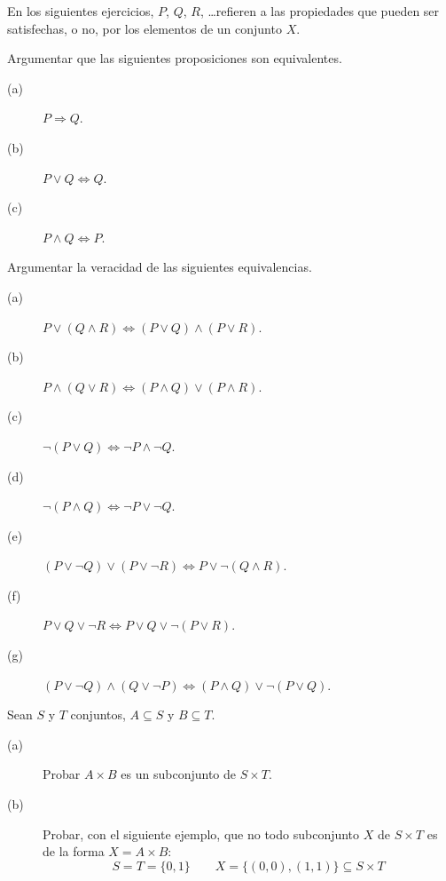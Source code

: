 \noindent
En los siguientes ejercicios, $P$, $Q$, $R$, \ldots refieren a las propiedades que pueden ser satisfechas, o no, por los elementos de un conjunto $X$.

\begin{ejercicio}
    Argumentar que las siguientes proposiciones son equivalentes.
    \begin{description}
        \item [(a)] $P \Longrightarrow Q$.
        \item [(b)] $P\lor Q \Longleftrightarrow Q$.
        \item [(c)] $P\land Q \Longleftrightarrow P$.
    \end{description}
\end{ejercicio}

\begin{ejercicio}
    Argumentar la veracidad de las siguientes equivalencias.
    \begin{description}
        \item [(a)] $P\lor(Q\land R) \Longleftrightarrow (P\lor Q)\land (P\lor R)$.
        \item [(b)] $P\land(Q\lor R) \Longleftrightarrow (P\land Q)\lor (P\land R)$.
        \item [(c)] $\neg(P\lor Q)\Longleftrightarrow \neg P \land \neg Q$.
        \item [(d)] $\neg(P\land Q)\Longleftrightarrow \neg P \lor \neg Q$.
        \item [(e)] $(P\lor \neg Q) \lor (P\lor \neg R) \Longleftrightarrow P\lor \neg (Q\land R)$.
        \item [(f)] $P\lor Q\lor \neg R \Longleftrightarrow P\lor Q\lor \neg (P\lor R)$.
        \item [(g)] $(P\lor \neg Q)\land(Q\lor \neg P)\Longleftrightarrow (P\land Q)\lor\neg(P\lor Q)$.
    \end{description}
\end{ejercicio}

\begin{ejercicio}
    Sean $S$ y $T$ conjuntos, $A\subseteq S$ y $B\subseteq T$.
    \begin{description}
        \item [(a)] Probar $A\times B$ es un subconjunto de $S\times T$.
        \item [(b)] Probar, con el siguiente ejemplo, que no todo subconjunto $X$ de $S\times T$ es de la forma $X=A\times B$:
            \begin{equation*}
                S = T = \{ 0,1 \} \qquad X = \{(0,0), (1,1)\} \subseteq S\times T
            \end{equation*}
    \end{description}
\end{ejercicio}

